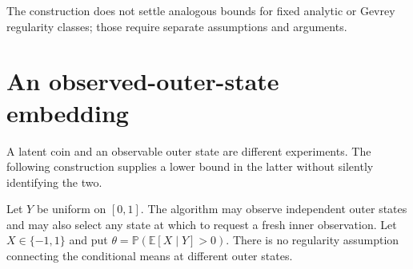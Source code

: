 \documentclass[11pt,a4paper]{article}
\theoremstyle{definition}
\newcommand{\E}{\mathbb E}
\newcommand{\Prob}{\mathbb P}
\begin{document}
The construction does not settle analogous bounds for fixed analytic or
Gevrey regularity classes; those require separate assumptions and arguments.

\section{An observed-outer-state embedding}\label{sec:outer}
A latent coin and an observable outer state are different experiments.
The following construction supplies a lower bound in the latter without
silently identifying the two.

Let $Y$ be uniform on $[0,1]$. The algorithm may observe independent outer
states and may also select any state at which to request a fresh inner
observation. Let $X\in\{-1,1\}$ and put
$\theta=\Prob(\E[X\mid Y]>0)$. There is no regularity assumption connecting
the conditional means at different outer states.
\end{document}
